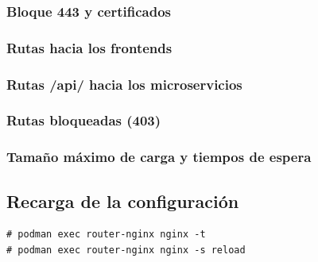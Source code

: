 \subsubsection{Bloque 443 y certificados}
\subsubsection{Rutas hacia los frontends}
\subsubsection{Rutas /api/ hacia los microservicios}
\subsubsection{Rutas bloqueadas (403)}
\subsubsection{Tamaño máximo de carga y tiempos de espera}

\subsection{Recarga de la configuración}
\begin{lstlisting}
# podman exec router-nginx nginx -t
# podman exec router-nginx nginx -s reload
\end{lstlisting}
